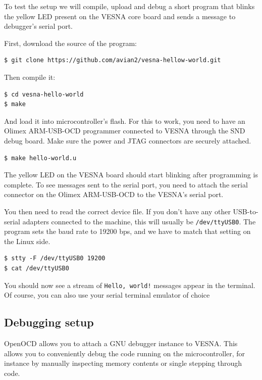 \documentclass[a4paper, 10pt]{article}
\begin{document}
To test the setup we will compile, upload and debug a short program that blinks
the yellow LED present on the VESNA core board and sends a message to debugger's
serial port.

First, download the source of the program:

\begin{verbatim}
$ git clone https://github.com/avian2/vesna-hellow-world.git
\end{verbatim}

Then compile it:

\begin{verbatim}
$ cd vesna-hello-world
$ make
\end{verbatim}

And load it into microcontroller's flash. For this to work, you need to have an
Olimex ARM-USB-OCD programmer connected to VESNA through the SND debug board.
Make sure the power and JTAG connectors are securely attached.

\begin{verbatim}
$ make hello-world.u
\end{verbatim}

The yellow LED on the VESNA board should start blinking after programming is complete.
To see messages sent to the serial port, you need to attach the serial
connector on the Olimex ARM-USB-OCD to the VESNA's serial port. 

You then need to read the correct device file. If you don't have any
other USB-to-serial adapters connected to the machine, this will usually be
\verb|/dev/ttyUSB0|. The program sets the baud rate to 19200 bps, and we have to
match that setting on the Linux side.

\begin{verbatim}
$ stty -F /dev/ttyUSB0 19200
$ cat /dev/ttyUSB0
\end{verbatim}

You should now see a stream of \verb|Hello, world!| messages appear in the
terminal. Of course, you can also use your serial terminal emulator of choice 

\subsection{Debugging setup}

OpenOCD allows you to attach a GNU debugger instance to VESNA. This allows you
to conveniently debug the code running on the microcontroller, for instance by
manually inspecting memory contents or single stepping through code.
\end{document}
